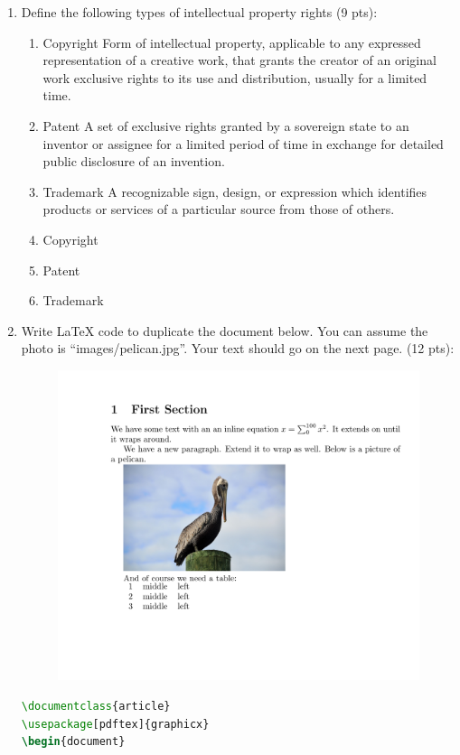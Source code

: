 \documentclass[10pt]{article}
\begin{document}
\begin{enumerate}
\item Define the following types of intellectual property rights (9 pts):
\begin{enumerate}
\beginanswers
	\item Copyright
	\bigskip
Form of intellectual property, applicable to any expressed representation of a creative work, that grants the creator of an original work exclusive rights to its use and distribution, usually for a limited time.
	\bigskip
	\item Patent
	\bigskip
A set of exclusive rights granted by a sovereign state to an inventor or assignee for a limited period of time in
exchange for detailed public disclosure of an invention.
	\bigskip
	\item Trademark
	\bigskip
A recognizable sign, design, or expression which identifies products or services of a particular source from those of others.
	\bigskip
\else
	\item Copyright
	\bigskip
	\bigskip
	\bigskip
	\bigskip
	\bigskip
	\bigskip
	\bigskip
	\bigskip
	\item Patent
	\bigskip
	\bigskip
	\bigskip
	\bigskip
	\bigskip
	\bigskip
	\bigskip
	\bigskip
	\item Trademark
	\bigskip
	\bigskip
	\bigskip
	\bigskip
	\bigskip
	\bigskip
	\bigskip
	\bigskip
\fi
\end{enumerate}

\item Write LaTeX code to duplicate the document below. You can assume the photo  is ``images/pelican.jpg''. Your text should go on the next page. (12 pts):
\begin{figure}[h]
	\centering
	\includegraphics[width=0.6\linewidth]{images/test1.png}
\end{figure}

\newpage
\beginanswers

\begin{lstlisting}[language=tex]
\documentclass{article}
\usepackage[pdftex]{graphicx}
\begin{document}

\end{lstlisting}
\end{enumerate}
\end{document}
